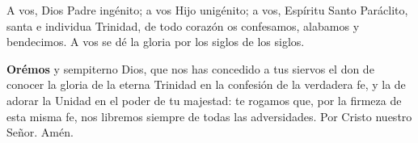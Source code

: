 A vos, Dios Padre ingénito; a vos Hijo unigénito; a vos, Espíritu Santo Paráclito, santa e individua Trinidad, de todo corazón os confesamos, alabamos y bendecimos. A vos se dé
la gloria por los siglos de los siglos.

\vspace{0.5em}


\vspace{0.5em}

\textbf{Orémos}
y sempiterno Dios, que nos has concedido a tus siervos el don de conocer la gloria de la eterna Trinidad en la confesión de la verdadera fe,
y la de adorar la Unidad en el poder de tu majestad: te rogamos que, por la firmeza de esta misma fe, nos libremos siempre de todas las adversidades. Por Cristo nuestro Señor.
Amén.

\vspace{0.5em}

\begin{otherlanguage}{latin}
      

      \vspace{0.5em}

      

      \vspace{0.5em}

      
\end{otherlanguage}